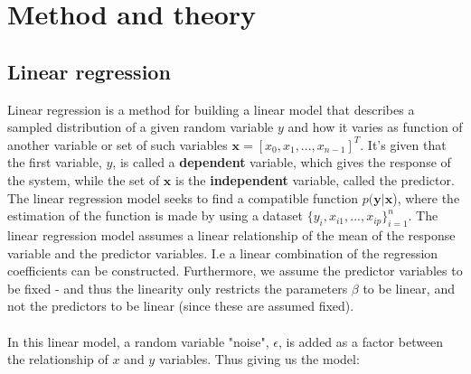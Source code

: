 \documentclass[../main.tex]{subfiles}
\begin{document}
\newpage
\section{Method and theory}\label{method_and_theory}




\subsection{Linear regression}
\cite{Lecture_notes_Morten}Linear regression is a method for building a linear model that %
describes a sampled distribution of a given random variable \ensuremath{y} and how it varies as function of another variable or set of such variables \ensuremath{\mathbf{x} = [x_0,x_1,...,x_{n-1}]^T}. It's given that the first variable, $y$, is called a \textbf{dependent} variable, which gives the response of the system, while the set of \ensuremath{\mathbf{x}} is the \textbf{independent} variable, called the predictor.
The linear regression model seeks to find a compatible function \ensuremath{p(\mathbf{y}|\mathbf{x}}), where the estimation of the function is made by using a dataset $\{y_i,x_{i1},...,x_{ip}\}_{i=1}^{n}$. The linear regression model assumes a linear relationship of the mean of the response variable and the predictor variables. I.e a linear combination of the regression coefficients can be constructed. Furthermore, we assume the predictor variables to be fixed - and thus the linearity only restricts the parameters $\beta$ to be linear, and not the predictors to be linear (since these are assumed fixed). \\ \\

In this linear model, a random variable "noise", $\epsilon$, is added as a factor between the relationship of $x$ and $y$ variables. Thus giving us the model:
\end{document}

